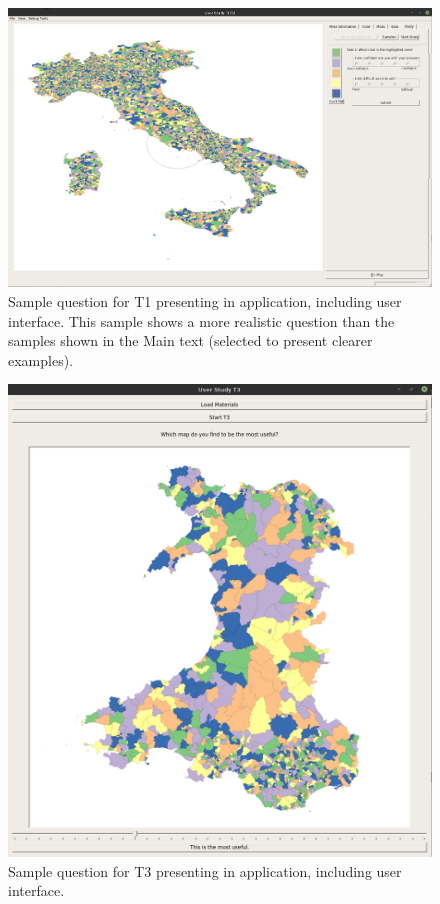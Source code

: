 \begin{figure}[t]
 \centering
\includegraphics[scale=0.35, angle=90]{images/T1.png}
\caption{Sample question for T1 presenting in application, including user interface. This sample shows a more realistic question than the samples shown in the Main text (selected to present clearer examples).} \label{fig:t1}
\end{figure}
\begin{figure}[t]
 \centering
\includegraphics[width=1\textwidth]{images/T2.png}
\caption{Sample question for T3 presenting in application, including user interface.} \label{fig:t3}
\end{figure}
